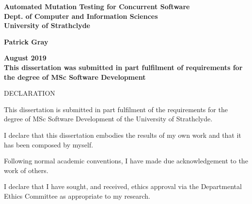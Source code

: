 \documentclass[a4paper,12pt]{article}
\begin{document}
\pagestyle{empty}                       %

\hfill

\par\noindent                                           %
\vspace*{0cm}
\begin{center}
        \Large\bf Automated Mutation Testing for Concurrent Software
        \vspace{2cm}
        \Large\bf  \\ Dept. of Computer and Information Sciences
        \\ University of Strathclyde
        
        \vspace{4cm}
        \Large\bf Patrick Gray\\[10pt]                     %
        \LARGE\bf          %
\end{center}
\vspace*{0cm}
\begin{center}
        \bf August 2019
        \vspace{3cm}
        \\This dissertation was submitted in part fulfilment of requirements for the degree of MSc Software Development
\end{center}
\vspace*{5mm}
%
%                       

\vspace*{2cm}



\newpage

%

DECLARATION 

This dissertation is submitted in part fulfilment of the requirements for the degree of MSc Software Development of the University of Strathclyde. 

I declare that this dissertation embodies the results of my own work and that it has been composed by myself. 

Following normal academic conventions, I have made due acknowledgement to the work of others. 

I declare that I have sought, and received, ethics approval via the Departmental Ethics Committee as appropriate to my research. 
\end{document}
